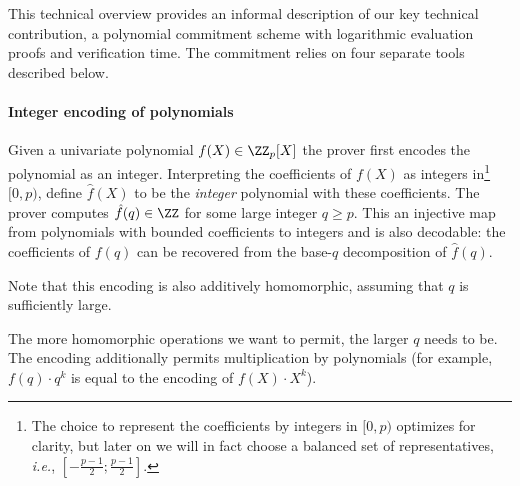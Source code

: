 This technical overview provides an informal description of our key technical contribution, a polynomial commitment scheme with logarithmic evaluation proofs and verification time.
The commitment relies on four separate tools described below.
\paragraph{Integer encoding of polynomials}
Given a univariate polynomial $f(X)\in \ZZ_p[X]$ the prover first encodes the polynomial as an integer. Interpreting the coefficients of $f(X)$ as integers in\footnote{The choice to represent the coefficients by integers in $[0,p)$ optimizes for clarity, but later on we will in fact choose a balanced set of representatives, \emph{i.e.}, $[-\frac{p-1}{2}; \frac{p-1}{2}]$.} $[0, p)$, define $\hat{f}(X)$ to be the \emph{integer} polynomial with these coefficients. The prover computes $\hat{f}(q)\in \ZZ$ for some large integer $q\geq p$. This an injective map from polynomials with bounded coefficients to integers and is also decodable: the coefficients of $f(q)$ can be recovered from the base-$q$ decomposition of $\hat{f}(q)$.
\begin{comment}
For example assume that $f(X)=2X^3+3X^2+4X+1 \in \ZZ_5[X]$ and $q=10$. Then the integer $f(q)=2341$ encodes the polynomial $f(X)$ because its coefficients appear in the $q$-ary expansion of $f(q)$.
\end{comment}
Note that this encoding is also additively homomorphic, assuming that $q$ is sufficiently large. 
\begin{comment}
For example, let $g(X)=4X^3+1X^2+3$ such that $g(10)=4103$. Then $f(10)+g(10)=6444=(g+f)(10)$. 
\end{comment}
The more homomorphic operations we want to permit, the larger $q$ needs to be.
The encoding additionally permits multiplication by polynomials (for example, $f(q)\cdot q^k$ is equal to the encoding of $f(X)\cdot X^k$). 
\begin{comment}
Or in our example $100 \cdot f(10)=234100$ which is the encoding of $2\cdot X^5+3\cdot X^4+4\cdot X^3+X^2$.
\end{comment}

